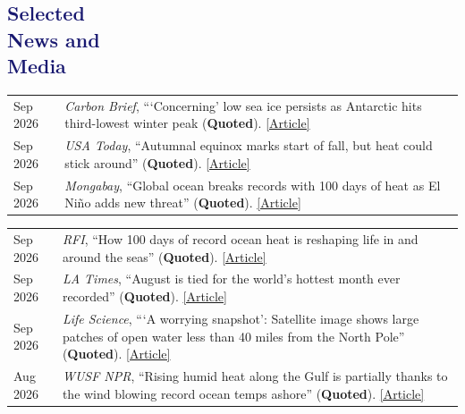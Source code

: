 \documentclass[margin,line,palatino,courier,10pt]{res}
\begin{document}
\begin{resume}
\section{\sc \textcolor{MidnightBlue}{\large{\textbf{Selected\\ News and\\ Media}}}}
\vspace*{0.04in}
\begin{tabular}{@{}p{0.9in}p{4in}}
Sep 2026 & \textit{Carbon Brief}, ```Concerning' low sea ice persists as Antarctic hits third-lowest winter peak (\textbf{Quoted}). \href{https://www.carbonbrief.org/concerning-low-sea-ice-persists-as-antarctic-hits-third-lowest-winter-peak?utm_content=buffer95d24&utm_medium=social&utm_source=twitter.com&utm_campaign=buffer}{[Article]}\\
Sep 2026 & \textit{USA Today}, ``Autumnal equinox marks start of fall, but heat could stick around'' (\textbf{Quoted}). \href{https://www.usatoday.com/story/news/weather/2026/09/22/when-is-autumnal-equinox-fall-begins/91810272007/}{[Article]}\\
Sep 2026 & \textit{Mongabay}, ``Global ocean breaks records with 100 days of heat as El Ni\~{n}o adds new threat'' (\textbf{Quoted}). \href{https://news.mongabay.com/2026/09/global-ocean-breaks-records-with-100-days-of-heat-as-el-nino-adds-new-threat/}{[Article]}\\
\end{tabular}
\begin{tabular}{@{}p{0.9in}p{4in}}
Sep 2026 & \textit{RFI}, ``How 100 days of record ocean heat is reshaping life in and around the seas'' (\textbf{Quoted}). \href{https://www.rfi.fr/en/environment/20260911-how-100-days-of-record-ocean-heat-is-reshaping-life-in-and-around-the-seas}{[Article]}\\
Sep 2026 & \textit{LA Times}, ``August is tied for the world’s hottest month ever recorded'' (\textbf{Quoted}). \href{https://www.latimes.com/environment/story/2026-09-10/august-is-tied-for-worlds-hottest-month-ever-recorded}{[Article]}\\
Sep 2026 & \textit{Life Science}, ```A worrying snapshot': Satellite image shows large patches of open water less than 40 miles from the North Pole'' (\textbf{Quoted}). \href{https://www.livescience.com/planet-earth/arctic/a-worrying-snapshot-satellite-image-shows-large-patches-of-open-water-less-than-40-miles-from-the-north-pole}{[Article]}\\
Aug 2026 & \textit{WUSF NPR}, ``Rising humid heat along the Gulf is partially thanks to the wind blowing record ocean temps ashore'' (\textbf{Quoted}). \href{https://www.wusf.org/weather/2026-08-31/rising-humid-heat-gulf-wind-blowing-record-ocean-temps-ashore}{[Article]}\\

\end{tabular}
\end{resume}
\end{document}
